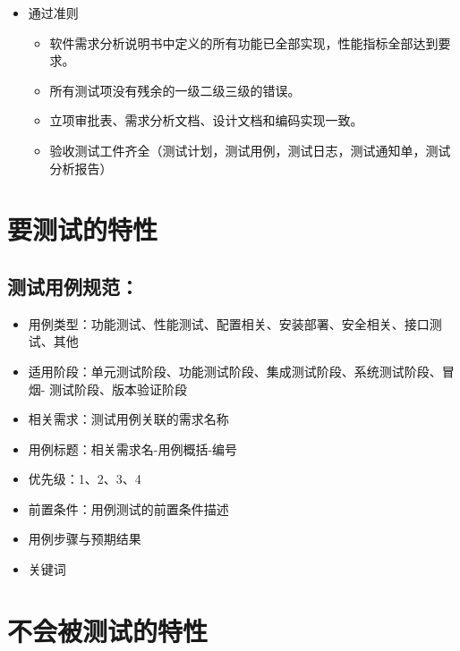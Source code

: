 \documentclass[hyperref, a4paper]{ctexart}
\providecommand{\tightlist}{%
  \setlength{\itemsep}{0pt}\setlength{\parskip}{0pt}}
\begin{document}
\begin{enumerate}
  \begin{itemize}
  \tightlist
  \item
    通过准则

    \begin{itemize}
    \tightlist
    \item
      软件需求分析说明书中定义的所有功能已全部实现，性能指标全部达到要求。
    \item
      所有测试项没有残余的一级二级三级的错误。
    \item
      立项审批表、需求分析文档、设计文档和编码实现一致。
    \item
      验收测试工件齐全（测试计划，测试用例，测试日志，测试通知单，测试分析报告）
    \end{itemize}
  \end{itemize}
\end{enumerate}

\hypertarget{ux8981ux6d4bux8bd5ux7684ux7279ux6027}{%
\section{要测试的特性}\label{ux8981ux6d4bux8bd5ux7684ux7279ux6027}}

\hypertarget{ux6d4bux8bd5ux7528ux4f8bux89c4ux8303}{%
\subsection{测试用例规范：}\label{ux6d4bux8bd5ux7528ux4f8bux89c4ux8303}}

\begin{itemize}
\tightlist
\item
  用例类型：功能测试、性能测试、配置相关、安装部署、安全相关、接口测试、其他
\item
  适用阶段：单元测试阶段、功能测试阶段、集成测试阶段、系统测试阶段、冒烟-
  测试阶段、版本验证阶段
\item
  相关需求：测试用例关联的需求名称
\item
  用例标题：相关需求名-用例概括-编号
\item
  优先级：1、2、3、4
\item
  前置条件：用例测试的前置条件描述
\item
  用例步骤与预期结果
\item
  关键词
\end{itemize}

\hypertarget{ux4e0dux4f1aux88abux6d4bux8bd5ux7684ux7279ux6027}{%
\section{不会被测试的特性}\label{ux4e0dux4f1aux88abux6d4bux8bd5ux7684ux7279ux6027}}
\end{document}
